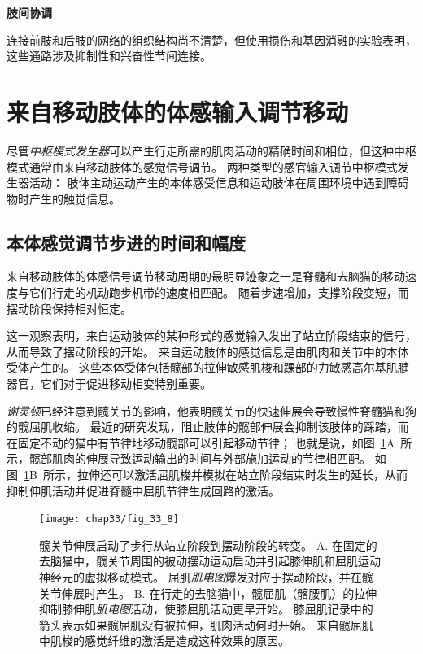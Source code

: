 \textbf{肢间协调}

连接前肢和后肢的网络的组织结构尚不清楚，但使用损伤和基因消融的实验表明，这些通路涉及抑制性和兴奋性节间连接。



\section{来自移动肢体的体感输入调节移动}

尽管\textit{中枢模式发生器}可以产生行走所需的肌肉活动的精确时间和相位，但这种中枢模式通常由来自移动肢体的感觉信号调节。
两种类型的感官输入调节中枢模式发生器活动：
肢体主动运动产生的本体感受信息和运动肢体在周围环境中遇到障碍物时产生的触觉信息。



\subsection{本体感觉调节步进的时间和幅度}

来自移动肢体的体感信号调节移动周期的最明显迹象之一是脊髓和去脑猫的移动速度与它们行走的机动跑步机带的速度相匹配。
随着步速增加，支撑阶段变短，而摆动阶段保持相对恒定。


这一观察表明，来自运动肢体的某种形式的感觉输入发出了站立阶段结束的信号，从而导致了摆动阶段的开始。
来自运动肢体的感觉信息是由肌肉和关节中的本体受体产生的。
这些本体受体包括髋部的拉伸敏感肌梭和踝部的力敏感高尔基肌腱器官，它们对于促进移动相变特别重要。


\textit{谢灵顿}已经注意到髋关节的影响，他表明髋关节的快速伸展会导致慢性脊髓猫和狗的髋屈肌收缩。
最近的研究发现，阻止肢体的髋部伸展会抑制该肢体的踩踏，而在固定不动的猫中有节律地移动髋部可以引起移动节律；
也就是说，如图~\ref{fig:33_8}A~所示，髋部肌肉的伸展导致运动输出的时间与外部施加运动的节律相匹配。
如图~\ref{fig:33_8}B~所示，拉伸还可以激活屈肌梭并模拟在站立阶段结束时发生的延长，从而抑制伸肌活动并促进脊髓中屈肌节律生成回路的激活。


\begin{figure}[htbp]
	\centering
	\texttt{[image: chap33/fig\_33\_8]}
	\caption{髋关节伸展启动了步行从站立阶段到摆动阶段的转变。
	A. 在固定的去脑猫中，髋关节周围的被动摆动运动启动并引起膝伸肌和屈肌运动神经元的虚拟移动模式。
	屈肌\textit{肌电图}爆发对应于摆动阶段，并在髋关节伸展时产生\cite{kriellaars1994mechanical}。
	B. 在行走的去脑猫中，髋屈肌（髂腰肌）的拉伸抑制膝伸肌\textit{肌电图}活动，使膝屈肌活动更早开始。
	膝屈肌记录中的箭头表示如果髋屈肌没有被拉伸，肌肉活动何时开始。
	来自髋屈肌中肌梭的感觉纤维的激活是造成这种效果的原因\cite{hiebert1996contribution}。}
	\label{fig:33_8}
\end{figure}


